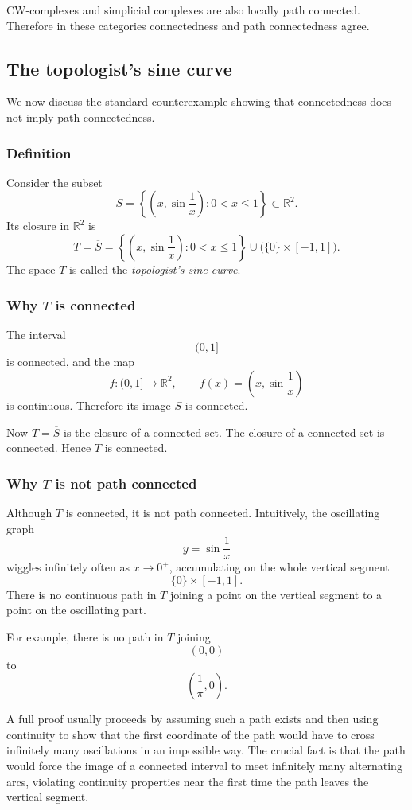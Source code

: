 \documentclass[12pt,a4paper]{article}
\theoremstyle{notespace}
\begin{document}
CW-complexes and simplicial complexes are also locally path connected. Therefore in these categories connectedness and path connectedness agree.

\subsection{The topologist's sine curve}

We now discuss the standard counterexample showing that connectedness does not imply path connectedness.

\subsubsection{Definition}

Consider the subset
\[
S
=
\left\{
\left(x,\sin\frac{1}{x}\right):0<x\leq 1
\right\}
\subset \mathbb{R}^2.
\]
Its closure in \(\mathbb{R}^2\) is
\[
T
=
\overline{S}
=
\left\{
\left(x,\sin\frac{1}{x}\right):0<x\leq 1
\right\}
\cup
\bigl(\{0\}\times[-1,1]\bigr).
\]
The space \(T\) is called the \emph{topologist's sine curve}.

\subsubsection{Why \(T\) is connected}

The interval
\[
(0,1]
\]
is connected, and the map
\[
f:(0,1]\to \mathbb{R}^2,
\qquad
f(x)=\left(x,\sin\frac{1}{x}\right)
\]
is continuous. Therefore its image \(S\) is connected.

Now \(T=\overline{S}\) is the closure of a connected set. The closure of a connected set is connected. Hence \(T\) is connected.

\subsubsection{Why \(T\) is not path connected}

Although \(T\) is connected, it is not path connected. Intuitively, the oscillating graph
\[
y=\sin\frac{1}{x}
\]
wiggles infinitely often as \(x\to 0^+\), accumulating on the whole vertical segment
\[
\{0\}\times[-1,1].
\]
There is no continuous path in \(T\) joining a point on the vertical segment to a point on the oscillating part.

For example, there is no path in \(T\) joining
\[
(0,0)
\]
to
\[
\left(\frac{1}{\pi},0\right).
\]

A full proof usually proceeds by assuming such a path exists and then using continuity to show that the first coordinate of the path would have to cross infinitely many oscillations in an impossible way. The crucial fact is that the path would force the image of a connected interval to meet infinitely many alternating arcs, violating continuity properties near the first time the path leaves the vertical segment.
\end{document}
